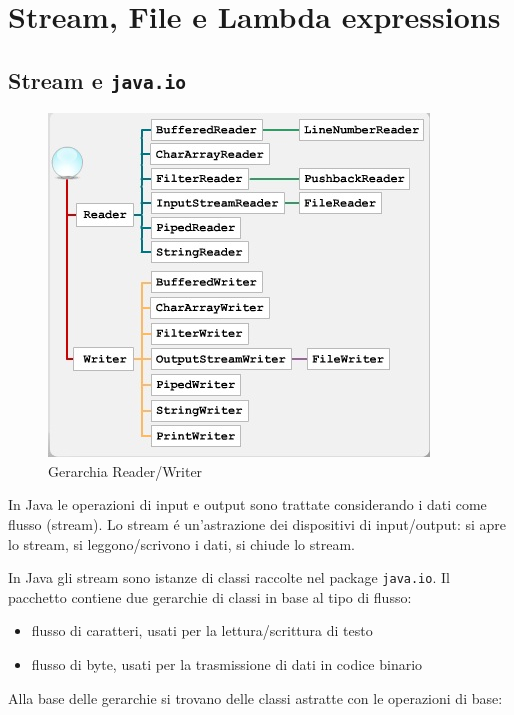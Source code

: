 \chapter{Stream, File e Lambda expressions}

\section{Stream e \texttt{java.io}}

\begin{figure}[h]
	\centering
	\includegraphics[]{res/img/io}
	\caption{Gerarchia Reader/Writer}
\end{figure}

In Java le operazioni di input e output sono trattate considerando i dati come flusso (stream). Lo stream é un'astrazione dei dispositivi di input/output: si apre lo stream, si leggono/scrivono i dati, si chiude lo stream.

In Java gli stream sono istanze di classi raccolte nel package \texttt{java.io}. Il pacchetto contiene due gerarchie di classi in base al tipo di flusso:
\begin{itemize}
 \item flusso di caratteri, usati per la lettura/scrittura di testo
 \item flusso di byte, usati per la trasmissione di dati in codice binario
\end{itemize}
Alla base delle gerarchie si trovano delle classi astratte con le operazioni di base:

